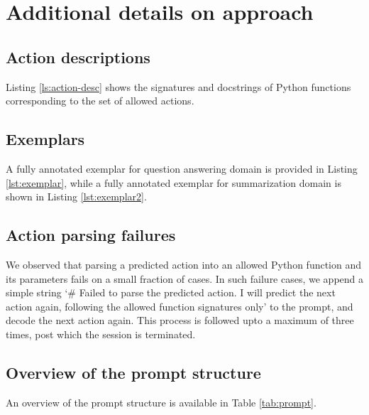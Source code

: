 \section{Additional details on approach}
\label{sec:appendix-approach}




\subsection{Action descriptions}
\label{sec:action_descriptions}

Listing \ref{ls:action-desc} shows the signatures and docstrings of Python functions corresponding to the set of allowed actions. 


\subsection{Exemplars}
\label{sec:exemplars}

A fully annotated exemplar for question answering domain is provided in Listing \ref{lst:exemplar}, while a fully annotated exemplar for summarization domain is shown in Listing \ref{lst:exemplar2}.


\subsection{Action parsing failures}
We observed that parsing a predicted action into an allowed Python function and its parameters fails on a small fraction of cases. In such failure cases, we append a simple string `\# Failed to parse the predicted action. I will predict the next action again, following the allowed function signatures only' to the prompt, and decode the next action again. This process is followed upto a maximum of three times, post which the session is terminated.


\subsection{Overview of the prompt structure}
An overview of the prompt structure is available in Table \ref{tab:prompt}.

